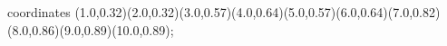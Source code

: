 					coordinates { (1.0,0.32)(2.0,0.32)(3.0,0.57)(4.0,0.64)(5.0,0.57)(6.0,0.64)(7.0,0.82)(8.0,0.86)(9.0,0.89)(10.0,0.89)};